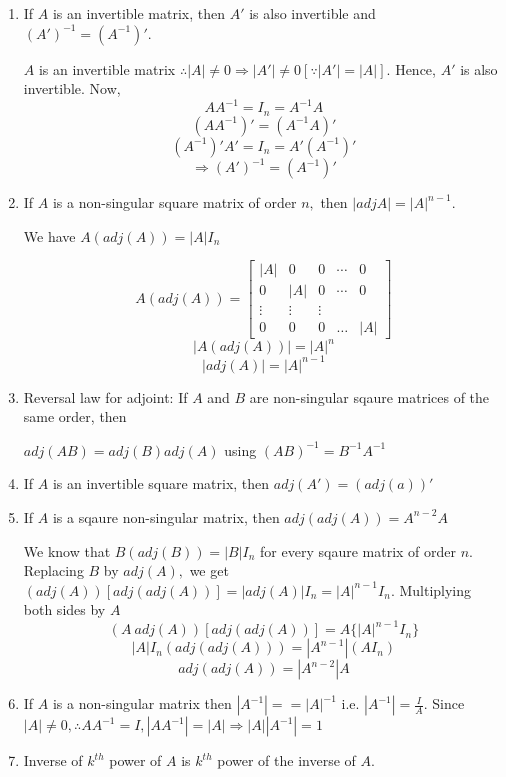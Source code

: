 \begin{enumerate}
\item  If $A$ is an invertible matrix, then $A'$ is also invertible and $(A')^{-1} = (A^{-1})'$.

$A$ is an invertible matrix $\therefore |A| \neq 0 \Rightarrow |A'|\neq 0 [\because |A'| = |A|]$. Hence, $A'$ is also invertible. Now,
\[AA^{-1} = I_n = A^{-1}A\]
\[(AA^{-1})' = (A^{-1}A)'\]
\[(A^{-1})'A' = I_n = A'(A^{-1})'\]
\[\Rightarrow (A')^{-1} = (A^{-1})'\]

\item  If $A$ is a non-singular square matrix of order $n,$ then $|adj A| = |A|^{n - 1}$.

We have $A(adj(A)) = |A|I_n$

\[A(adj(A)) = \begin{bmatrix}|A| & 0 & 0 & \cdots & 0 \\ 0 & |A| & 0 & \cdots & 0 \\ \vdots & \vdots & \vdots \\ 0 & 0 & 0 & \ldots
  & |A|\end{bmatrix}\]
\[|A(adj(A))| = |A|^n\]
\[|adj(A)| = |A|^{n - 1}\]

\item  Reversal law for adjoint: If $A$ and $B$ are non-singular
   sqaure matrices of the same order, then

   $adj(AB) = adj(B)adj(A)$ using $(AB)^{-1} = B^{-1}A^{-1}$

\item  If $A$ is an invertible square matrix, then $adj(A') =
   (adj(a))'$

\item  If $A$ is a sqaure non-singular matrix, then $adj(adj(A)) = A^{n
   - 2}A$

We know that $B(adj(B)) = |B|I_n$ for every sqaure matrix of order $n.$ Replacing $B$ by $adj(A),$ we get $(adj(A))[adj(adj(A))] =
|adj(A)|I_n = |A|^{n - 1}I_n$. Multiplying both sides by $A$
\[(A~adj(A))[adj(adj(A))] = A\{|A|^{n - 1}I_n\}\]
\[|A|I_n (adj(adj(A))) = |A^{n - 1}|(AI_n)\]
\[adj(adj(A)) = |A^{n - 2}|A\]

\item  If $A$ is a non-singular matrix then $|A^{-1}| = = |A|^{-1}$ i.e. $|A^{-1}| = \frac{I}{A}$. Since $|A|\neq 0, \therefore
  AA^{-1} = I, |AA^{-1}| = |A|\Rightarrow |A||A^{-1}| = 1$

\item  Inverse of $k^{th}$ power of $A$ is $k^{th}$ power of the inverse of $A$.
\end{enumerate}

